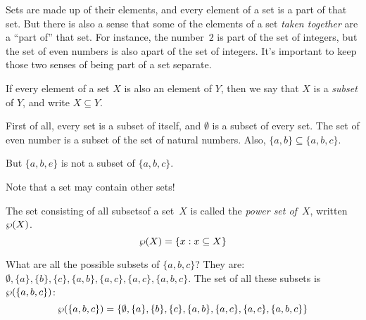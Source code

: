 \documentclass[open-logic-section]{subfiles}
\begin{document}

\begin{wordy}
Sets are made up of their elements, and every element of a set is a
part of that set.  But there is also a sense that some of the elements
of a set \emph{taken together} are a ``part of'' that set. For
instance, the number~$2$ is part of the set of integers, but the set
of even numbers is also apart of the set of integers. It's important
to keep those two senses of being part of a set separate.
\end{wordy}

\begin{defn}
If every element of a set $X$ is also an element of
    $Y$, then we say that $X$ is a \emph{subset} of $Y$, and write $X
    \subseteq Y$.
\end{defn}

\begin{ex}
First of all, every set is a subset of itself, and $\emptyset$ is a
subset of every set. The set of even number is a subset of the set of
natural numbers.  Also, $\{ a, b \} \subseteq \{ a, b, c \}$.

But $\{ a, b, e \}$ is not a subset of $\{ a, b, c \}$.
\end{ex}

\begin{wordy}
Note that a set may contain other sets!  
\end{wordy}


\begin{defn}
The set consisting of all subsetsof a set~$X$ is called the
\emph{power set of}~$X$, written $\wp(X)$.
    \[\wp(X) = \{ x : x \subseteq X \} \]
\end{defn}

\begin{ex}
What are all the possible subsets of $\{ a, b, c \}$? They are:
$\emptyset, \{a \}, \{b\}, \{c\}, \{a, b\}, \{a, c\}, \{a, c\}, \{a,
b, c\}$.  The set of all these subsets is $\wp(\{a,b,c\})$:
\[
\wp(\{ a, b, c \}) = \{\emptyset, \{a \}, \{b\}, \{c\}, \{a, b\},
\{a, c\}, \{a, c\}, \{a, b, c\}\}
\]
\end{ex}
\end{document}
